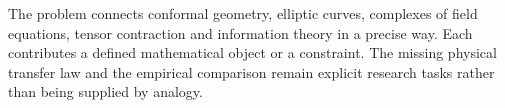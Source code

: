 The problem connects conformal geometry, elliptic curves, complexes of
field equations, tensor contraction and information theory in a precise
way. Each contributes a defined mathematical object or a constraint.
The missing physical transfer law and the empirical comparison remain
explicit research tasks rather than being supplied by analogy.
